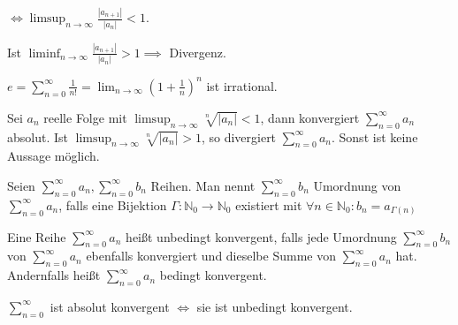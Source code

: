 \begin{remark}
  $\iff \limsup_{n \to \infty} \frac{|a_{n+1}|}{|a_n|} < 1$.

  Ist $\liminf_{n \to \infty} \frac{|a_{n+1}|}{|a_n|} > 1 \implies$ Divergenz.
\end{remark}

\begin{theorem}
  $e = \sum_{n=0}^{\infty} \frac{1}{n!} = \lim_{n \to \infty} \left( 1 + \frac{1}{n} \right)^n$ ist irrational.
\end{theorem}

\begin{theorem}[Wurzelkriterium]
  Sei $a_n$ reelle Folge mit $\limsup_{n \to \infty} \sqrt[n]{|a_n|} < 1$, dann konvergiert $\sum_{n=0}^{\infty} a_n$ absolut. Ist $\limsup_{n \to \infty} \sqrt[n]{|a_n|} > 1$, so divergiert $\sum_{n=0}^{\infty} a_n$. Sonst ist keine Aussage möglich.
\end{theorem}

\begin{definition}
  Seien $\sum_{n=0}^{\infty} a_n, \sum_{n=0}^{\infty} b_n$ Reihen. Man nennt $\sum_{n=0}^{\infty} b_n$ Umordnung von $\sum_{n=0}^{\infty} a_n$, falls eine Bijektion $\Gamma: \mathbb{N}_0 \to \mathbb{N}_0$ existiert mit $\forall n \in \mathbb{N}_0: b_n = a_{\Gamma(n)}$
\end{definition}

\begin{definition}
  Eine Reihe $\sum_{n=0}^{\infty} a_n$ heißt unbedingt konvergent, falls jede Umordnung $\sum_{n=0}^{\infty} b_n$ von $\sum_{n=0}^{\infty} a_n$ ebenfalls konvergiert und dieselbe Summe von $\sum_{n=0}^{\infty} a_n$ hat. Andernfalls heißt $\sum_{n=0}^{\infty} a_n$ bedingt konvergent.
\end{definition}

\begin{theorem}
  $\sum_{n=0}^{\infty}$ ist absolut konvergent $\iff$ sie ist unbedingt konvergent.
\end{theorem}